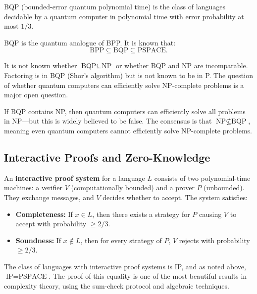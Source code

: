 \begin{definition}[BQP]
BQP (bounded-error quantum polynomial time) is the class of languages decidable by a quantum computer in polynomial time with error probability at most $1/3$.
\end{definition}

BQP is the quantum analogue of BPP. It is known that:
\[
\text{BPP} \subseteq \text{BQP} \subseteq \text{PSPACE}.
\]

It is not known whether $\text{BQP} \subseteq \text{NP}$ or whether BQP and NP are incomparable. Factoring is in BQP (Shor's algorithm) but is not known to be in P. The question of whether quantum computers can efficiently solve NP-complete problems is a major open question.

\begin{remark}
If BQP contains NP, then quantum computers can efficiently solve all problems in NP---but this is widely believed to be false. The consensus is that $\text{NP} \not\subseteq \text{BQP}$, meaning even quantum computers cannot efficiently solve NP-complete problems.
\end{remark}

\subsection{Interactive Proofs and Zero-Knowledge}

\begin{definition}
An \textbf{interactive proof system} for a language $L$ consists of two polynomial-time machines: a verifier $V$ (computationally bounded) and a prover $P$ (unbounded). They exchange messages, and $V$ decides whether to accept. The system satisfies:
\begin{itemize}
  \item \textbf{Completeness:} If $x \in L$, then there exists a strategy for $P$ causing $V$ to accept with probability $\geq 2/3$.
  \item \textbf{Soundness:} If $x \notin L$, then for every strategy of $P$, $V$ rejects with probability $\geq 2/3$.
\end{itemize}
\end{definition}

The class of languages with interactive proof systems is IP, and as noted above, $\text{IP} = \text{PSPACE}$. The proof of this equality is one of the most beautiful results in complexity theory, using the sum-check protocol and algebraic techniques.

